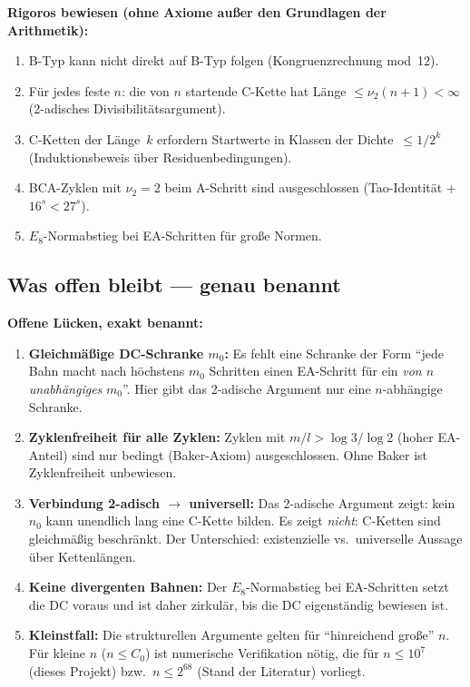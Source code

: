 \documentclass[12pt,a4paper]{article}
\newcommand{\vii}{\nu_2}
\begin{document}
\begin{tcolorbox}[ergebnis]
\textbf{Rigoros bewiesen (ohne Axiome außer den Grundlagen der Arithmetik):}
\begin{enumerate}[label=(\arabic*)]
  \item B-Typ kann nicht direkt auf B-Typ folgen
    (Kongruenzrechnung mod~12).
  \item Für jedes feste $n$: die von $n$ startende C-Kette hat Länge
    $\leq \vii(n+1) < \infty$ (2-adisches Divisibilitätsargument).
  \item C-Ketten der Länge~$k$ erfordern Startwerte in Klassen der
    Dichte~$\leq 1/2^k$ (Induktionsbeweis über Residuenbedingungen).
  \item B\textbullet C\textbullet A-Zyklen mit $\vii=2$ beim A-Schritt sind
    ausgeschlossen (Tao-Identität + $16^s < 27^s$).
  \item $E_8$-Normabstieg bei EA-Schritten für große Normen.
\end{enumerate}
\end{tcolorbox}

\subsection{Was offen bleibt --- genau benannt}

\begin{tcolorbox}[lücke]
\textbf{Offene Lücken, exakt benannt:}
\begin{enumerate}[label=(\arabic*)]
  \item \textbf{Gleichmäßige DC-Schranke $m_0$:}
    Es fehlt eine Schranke der Form ``jede Bahn macht nach höchstens $m_0$
    Schritten einen EA-Schritt für ein \emph{von $n$ unabhängiges} $m_0$''.
    Hier gibt das 2-adische Argument nur eine $n$-abhängige Schranke.

  \item \textbf{Zyklenfreiheit für alle Zyklen:}
    Zyklen mit $m/l > \log3/\log2$ (hoher EA-Anteil) sind nur bedingt
    (Baker-Axiom) ausgeschlossen. Ohne Baker ist Zyklenfreiheit unbewiesen.

  \item \textbf{Verbindung 2-adisch $\to$ universell:}
    Das 2-adische Argument zeigt: kein $n_0$ kann unendlich lang eine
    C-Kette bilden. Es zeigt \emph{nicht}: C-Ketten sind gleichmäßig beschränkt.
    Der Unterschied: existenzielle vs.\ universelle Aussage über Kettenlängen.

  \item \textbf{Keine divergenten Bahnen:}
    Der $E_8$-Normabstieg bei EA-Schritten setzt die DC voraus und ist
    daher zirkulär, bis die DC eigenständig bewiesen ist.

  \item \textbf{Kleinstfall:}
    Die strukturellen Argumente gelten für ``hinreichend große'' $n$.
    Für kleine $n$ ($n \leq C_0$) ist numerische Verifikation nötig,
    die für $n \leq 10^7$ (dieses Projekt) bzw.\ $n \leq 2^{68}$
    (Stand der Literatur) vorliegt.
\end{enumerate}
\end{tcolorbox}
\end{document}
